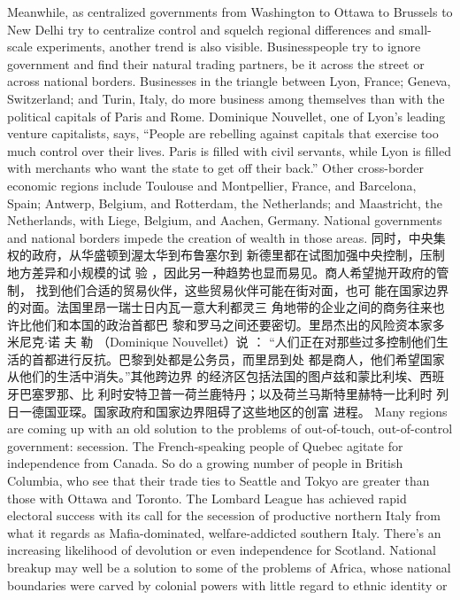 \begin{paracol}{2}
\switchcolumn*
Meanwhile, as centralized governments from Washington to
Ottawa to Brussels to New Delhi try to centralize control and
squelch regional differences and small-scale experiments, another trend is also visible. Businesspeople try to ignore government and find their natural trading partners, be it across the
street or across national borders. Businesses in the triangle between Lyon, France; Geneva, Switzerland; and Turin, Italy, do
more business among themselves than with the political capitals of Paris and Rome. Dominique Nouvellet, one of Lyon's
leading venture capitalists, says, ``People are rebelling against
capitals that exercise too much control over their lives. Paris is
filled with civil servants, while Lyon is filled with merchants
who want the state to get off their back.'' Other cross-border
economic regions include Toulouse and Montpellier, France,
and Barcelona, Spain; Antwerp, Belgium, and Rotterdam, the
Netherlands; and Maastricht, the Netherlands, with Liege, Belgium, and Aachen, Germany. National governments and national borders impede the creation of wealth in those areas.
\switchcolumn
同时，中央集权的政府，从华盛顿到渥太华到布鲁塞尔到
新德里都在试图加强中央控制，压制地方差异和小规模的试
验 ，因此另一种趋势也显而易见。商人希望抛开政府的管制，
找到他们合适的贸易伙伴，这些贸易伙伴可能在街对面，也可
能在国家边界的对面。法国里昂一瑞士日内瓦一意大利都灵三
角地带的企业之间的商务往来也许比他们和本国的政治首都巴
黎和罗马之间还要密切。里昂杰出的风险资本家多米尼克$\cdot$诺
夫 勒 （Dominique  Nouvellet）说 ： “人们正在对那些过多控制他们生活的首都进行反抗。巴黎到处都是公务员，而里昂到处
都是商人，他们希望国家从他们的生活中消失。”其他跨边界
的经济区包括法国的图卢兹和蒙比利埃、西班牙巴塞罗那、比
利时安特卫普一荷兰鹿特丹；以及荷兰马斯特里赫特一比利时
列日一德国亚琛。国家政府和国家边界阻碍了这些地区的创富
进程。
\switchcolumn*
Many regions are coming up with an old solution to the problems of out-of-touch, out-of-control government: secession. The French-speaking people of Quebec agitate for independence from Canada. So do a growing number of people in
British Columbia, who see that their trade ties to Seattle and
Tokyo are greater than those with Ottawa and Toronto. The
Lombard League has achieved rapid electoral success with its
call for the secession of productive northern Italy from what it
regards as Mafia-dominated, welfare-addicted southern Italy.
There's an increasing likelihood of devolution or even independence for Scotland. National breakup may well be a solution to
some of the problems of Africa, whose national boundaries were
carved by colonial powers with little regard to ethnic identity or

\end{paracol}
